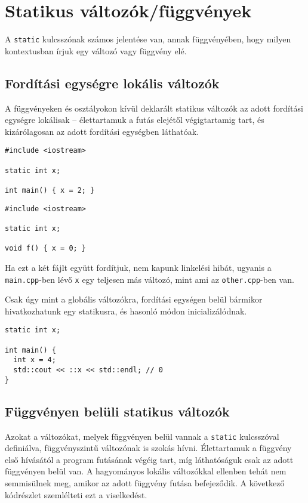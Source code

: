 \documentclass[../cpp_book/cpp_book.tex]{subfiles}
\begin{document}

	\section{Statikus változók/függvények}
	A \texttt{static} kulcsszónak számos jelentése van, annak függvényében, hogy milyen kontextusban írjuk egy változó vagy függvény elé. 
	\subsection{Fordítási egységre lokális változók}
	A függvényeken és osztályokon kívül deklarált statikus változók az adott fordítási egységre lokálisak -- élettartamuk a futás elejétől végigtartamig tart, és kizárólagosan az adott fordítási egységben láthatóak.
	\medskip
	
	\begin{lstlisting}
#include <iostream>

static int x;

int main() { x = 2; }
	\end{lstlisting}
	\medskip
	
	\begin{lstlisting}
#include <iostream>

static int x;

void f() { x = 0; }
	\end{lstlisting}
	Ha ezt a két fájlt együtt fordítjuk, nem kapunk linkelési hibát, ugyanis a \texttt{main.cpp}-ben lévő \texttt{x} egy teljesen más változó, mint ami az \texttt{other.cpp}-ben van.
	
	\smallskip
	Csak úgy mint a globális változókra, fordítási egységen belül bármikor hivatkozhatunk egy statikusra, és hasonló módon inicializálódnak.
	\begin{lstlisting}
static int x;

int main() {
  int x = 4;
  std::cout << ::x << std::endl; // 0
}
	\end{lstlisting}
	\subsection{Függvényen belüli statikus változók}
	Azokat a változókat, melyek függvényen belül vannak a \texttt{static} kulcsszóval definiálva, függvényszintű változónak is szokás hívni. Élettartamuk a függvény első hívásától a program futásának végéig tart, míg láthatóságuk csak az adott függvényen belül van. A hagyományos lokális változókkal ellenben tehát nem semmisülnek meg, amikor az adott függvény futása befejeződik. A következő kódrészlet szemlélteti ezt a viselkedést.
	
\end{document}
